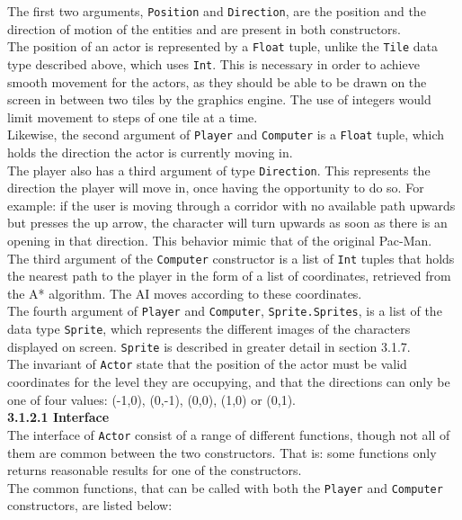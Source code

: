 \documentclass{article}
\begin{document}
    	\noindent The first two arguments, \texttt{Position} and \texttt{Direction}, are the position and the direction of motion of the entities and are present in both constructors.\\
		\newline
		The position of an actor is represented by a \texttt{Float} tuple, unlike the \texttt{Tile} data type described above, which uses \texttt{Int}. This is necessary in order to achieve smooth movement for the actors, as they should be able to be drawn on the screen in between two tiles by the graphics engine. The use of integers would limit movement to steps of one tile at a time.\\
		\newline
		Likewise, the second argument of \texttt{Player} and \texttt{Computer} is a \texttt{Float} tuple, which holds the direction the actor is currently moving in.\\
		\newline
    	The player also has a third argument of type \texttt{Direction}. This represents the direction the player will move in, once having the opportunity to do so. For example: if the user is moving through a corridor with no available path upwards but presses the up arrow, the character will turn upwards as soon as there is an opening in that direction. This behavior mimic that of the original Pac-Man.\\
		\newline
		The third argument of the \texttt{Computer} constructor is a list of \texttt{Int} tuples that holds the nearest path to the player in the form of a list of coordinates, retrieved from the A* algorithm. The AI moves according to these coordinates. \\
		\newline
    	The fourth argument of \texttt{Player} and \texttt{Computer}, \texttt{Sprite.Sprites}, is a list of the data type \texttt{Sprite}, which represents the different images of the characters displayed on screen. \texttt{Sprite} is described in greater detail in section 3.1.7. \\
		\newline
        The invariant of \texttt{Actor} state that the position of the actor must be valid coordinates for the level they are occupying, and that the directions can only be one of four values: (-1,0), (0,-1), (0,0), (1,0) or (0,1). \\
        \newline
		\textbf{3.1.2.1 Interface} \\
    	\newline
    	The interface of \texttt{Actor} consist of a range of different functions, though not all of them are common between the two constructors. That is: some functions only returns reasonable results for one of the constructors.\\
	    \newline
        The common functions, that can be called with both the \texttt{Player} and \texttt{Computer} constructors, are listed below: \\
\end{document}
